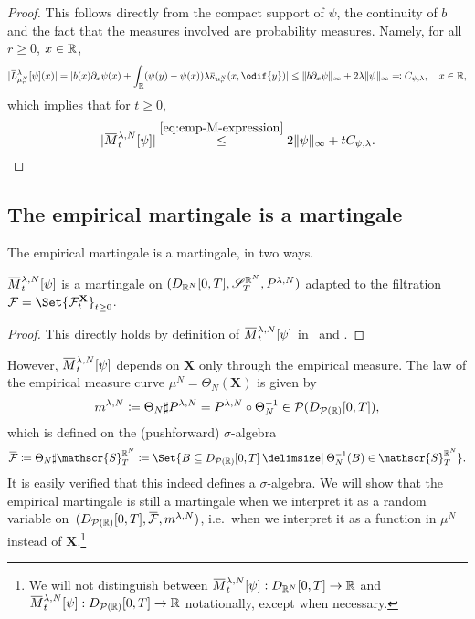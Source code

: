 \begin{proof}
  This follows directly from the compact support of \( \psi \), the continuity of \( b \) and the fact that the measures involved are probability measures.
  Namely, for all \( r \geq 0 \), \( x \in \mathbb{R} \),
  \begin{equation}
    \abs{ \ol{L}_{\mu_{r}^N}^{\lambda} [\psi](x) }
    = \abs{ b(x) \partial_x \psi(x) + \int_\potspace (\psi(y) - \psi(x)) \lambda \ol{\kappa}_{\mu_{r}^N}(x, \odif{y}) }
    \leq \norm{b \partial_x \psi}_\infty + 2 \lambda \norm{\psi}_\infty
    \eqqcolon C_{\psi, \lambda}, \quad x \in \potspace,
  \end{equation}
  which implies that for \( t \geq 0 \),
  \begin{equation}
    \abs{ \ol{M}_t^{\lambda, N}[\psi] }
    \overset{\eqref{eq:emp-M-expression}}{\leq} 2 \norm{\psi}_\infty + t C_{\psi, \lambda}.
  \end{equation}
\end{proof}

\subsection{The empirical martingale is a martingale}

The empirical martingale is a martingale, in two ways.
\begin{corollary}\label{cor:easy-emp-M-mart}
  \(\ol{M}_t^{\lambda,N}[\psi]\) is a martingale on \((D_{\mathbb{R}^N}[0,T], \mathscr{S}_T^{\mathbb{R}^N}, P^{\lambda, N})\) adapted to the filtration \( \cF = \Set{\cF_t^\bm{X}}_{t\geq0} \).
\end{corollary}
\begin{proof}
  This directly holds by definition of \( \ol{M}_t^{\lambda,N}[\psi] \) in~ and .
\end{proof}

However, \(\ol{M}_t^{\lambda,N}[\psi]\) depends on \( \bm{X} \) only through the empirical measure.
The law of the empirical measure curve \(\mu^N = \Theta_N(\bm{X})\) is given by
\begin{equation}
  m^{\lambda,N} \coloneqq \Theta_N \sharp P^{\lambda, N} = P^{\lambda, N} \circ \Theta_N^{-1} \in \mathcal{P}(D_{\mathcal{P}(\mathbb{R})}[0,T]),
\end{equation}
which is defined on the (pushforward) \( \sigma \)-algebra
\begin{equation}
  \ol{\cF} \coloneqq \Theta_N \sharp \mathscr{S}_T^{\potspace^N} \coloneqq \Set{B \subseteq D_{\cP(\potspace)}[0,T] \given \Theta_N^{-1}(B) \in \mathscr{S}_T^{\potspace^N}}.
\end{equation}
It is easily verified that this indeed defines a \( \sigma \)-algebra.
We will show that the empirical martingale is still a martingale when we interpret it as a random variable on~\((D_{\cP(\potspace)}[0,T], \ol{\cF}, \lawmu^{\lambda,N})\), i.e.\ when we interpret it as a function in \(\mu^N\) instead of \(\bm{X}\).\footnote{We will not distinguish between \( \ol{M}_t^{\lambda,N}[\psi] :  D_{\potspace^N}[0,T] \to \bR \) and \( \ol{M}_t^{\lambda,N}[\psi] :  D_{\cP(\potspace)}[0,T] \to \bR \) notationally, except when necessary.}

